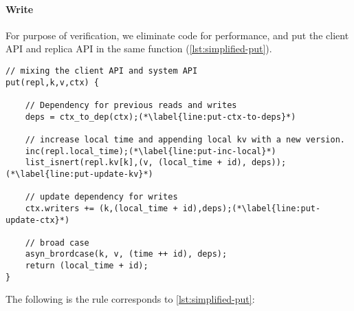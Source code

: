 \paragraph{\bf Write}
For purpose of verification, we eliminate code for performance, and put the client API and replica API in the same function (\cref{lst:simplified-put}).
\begin{lstlisting}[caption={put},label={lst:simplified-put}]
// mixing the client API and system API
put(repl,k,v,ctx) {

    // Dependency for previous reads and writes
    deps = ctx_to_dep(ctx);(*\label{line:put-ctx-to-deps}*)

    // increase local time and appending local kv with a new version.
    inc(repl.local_time);(*\label{line:put-inc-local}*) 
    list_isnert(repl.kv[k],(v, (local_time + id), deps));(*\label{line:put-update-kv}*)

    // update dependency for writes
    ctx.writers += (k,(local_time + id),deps);(*\label{line:put-update-ctx}*)

    // broad case
    asyn_brordcase(k, v, (time ++ id), deps);
    return (local_time + id);
}
\end{lstlisting}

The following is the rule corresponds to \cref{lst:simplified-put}:

